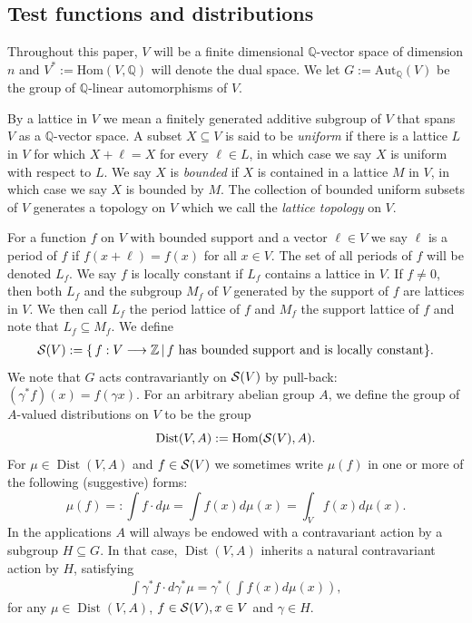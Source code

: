 \documentclass[12pt,amstex,amssymb]{article}
\theoremstyle{plain}
\theoremstyle{definition}
\def\lra{\longrightarrow}
\def\g{\gamma}
\def\cS{{\cal S}}
\def\Z{{\mathbb Z}}
\def\Q{{\mathbb Q}}
\def\Hom{\text{Hom}}
\def\Aut{\text{Aut}}
\def\g{\gamma}
\newcommand{\bea}{\begin{eqnarray}}
\newcommand{\eea}{\end{eqnarray}}
\newcommand{\Dist}{\operatorname{Dist}}
\begin{document}
\subsection{Test functions and distributions}
Throughout this paper, $V$ will be a finite dimensional $\Q$-vector space of dimension $n$ and $V^\ast := \Hom(V,\Q)$ will denote the dual space.
We let $G := \Aut_\Q(V)$ be the group of $\Q$-linear automorphisms of $V$.

By a lattice in $V$ we mean a finitely generated additive subgroup of $V$ that spans $V$ as a $\Q$-vector space.  A subset
$X\subseteq V$ is said to be {\it uniform} if there is a lattice $L$ in $V$ for which $X+\ell = X$ for every $\ell \in L$, in which case we say
$X$ is uniform with respect to $L$.  
We say $X$ is {\it bounded} if $X$ is contained in a lattice $M$ in $V$, in which case we say $X$ is bounded by $M$.   The collection of bounded uniform subsets of $V$ generates a topology on $V$ which we call the {\it lattice topology} on $V$.   %

For a function $f$ on 
$V$ with bounded support and a vector $\ell\in V$ we say $\ell$ is a period of $f$ if $f(x+\ell) = f(x)$ for all $x\in V$.   The set of all periods of $f$ will be denoted 
$L_f$.   We say $f$ is locally constant if $L_f$ contains a lattice in $V$.  If $f\ne 0$, then both $L_f$ and the subgroup $M_f$ of $V$ generated 
by the support of $f$ are lattices in $V$.  We then call $L_f$ the period lattice of $f$ and $M_f$ the support lattice of $f$ and note that $L_f \subseteq M_f$.
We define
\bea \label{testftn}
\cS(V) := \{\, f : V \lra \Z\,|\, f \hbox{ has bounded support and is locally constant}\}.
\eea
We note that $G$ acts contravariantly on $\cS(V)$ by pull-back:  $(\g^\ast f) (x) = f( \g x)$.
For an arbitrary abelian group $A$, we define the group of $A$-valued distributions on
$V$ to be the group
$$
\Dist(V,A) := \Hom(\cS(V),A).
$$
For $\mu \in \Dist(V,A)$ and $f\in \cS(V)$ %
we sometimes write $\mu(f)$ in one or more of the following (suggestive) forms:
$$
\mu(f) =: \int f\cdot d\mu = \int f(x)d\mu(x) = \int_V f(x)d\mu(x).
$$
 In the applications $A$ will always be endowed with a contravariant action by a subgroup $H \subseteq G$.   In that case,  $\Dist(V,A)$ inherits a natural contravariant action by $H$, satisfying
\bea \label{distributionaction}
\int \gamma^\ast f \cdot d\gamma^\ast\mu = \gamma^\ast \left(\int f(x)d\mu(x)\right),
\eea
for any $\mu\in \Dist(V,A)$, $f\in \cS(V), x \in V$ and $ \gamma\in H$.
\end{document}
